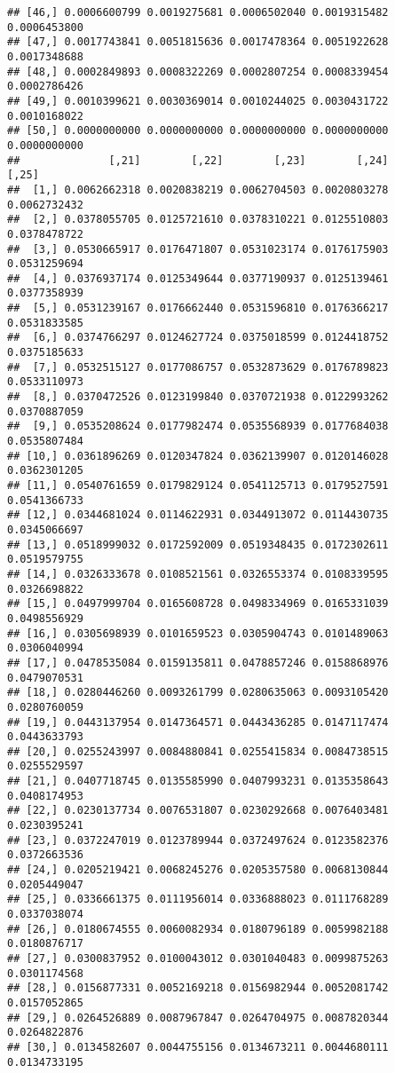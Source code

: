 \documentclass[]{article}
\begin{document}
\begin{verbatim}
## [46,] 0.0006600799 0.0019275681 0.0006502040 0.0019315482 0.0006453800
## [47,] 0.0017743841 0.0051815636 0.0017478364 0.0051922628 0.0017348688
## [48,] 0.0002849893 0.0008322269 0.0002807254 0.0008339454 0.0002786426
## [49,] 0.0010399621 0.0030369014 0.0010244025 0.0030431722 0.0010168022
## [50,] 0.0000000000 0.0000000000 0.0000000000 0.0000000000 0.0000000000
##              [,21]        [,22]        [,23]        [,24]        [,25]
##  [1,] 0.0062662318 0.0020838219 0.0062704503 0.0020803278 0.0062732432
##  [2,] 0.0378055705 0.0125721610 0.0378310221 0.0125510803 0.0378478722
##  [3,] 0.0530665917 0.0176471807 0.0531023174 0.0176175903 0.0531259694
##  [4,] 0.0376937174 0.0125349644 0.0377190937 0.0125139461 0.0377358939
##  [5,] 0.0531239167 0.0176662440 0.0531596810 0.0176366217 0.0531833585
##  [6,] 0.0374766297 0.0124627724 0.0375018599 0.0124418752 0.0375185633
##  [7,] 0.0532515127 0.0177086757 0.0532873629 0.0176789823 0.0533110973
##  [8,] 0.0370472526 0.0123199840 0.0370721938 0.0122993262 0.0370887059
##  [9,] 0.0535208624 0.0177982474 0.0535568939 0.0177684038 0.0535807484
## [10,] 0.0361896269 0.0120347824 0.0362139907 0.0120146028 0.0362301205
## [11,] 0.0540761659 0.0179829124 0.0541125713 0.0179527591 0.0541366733
## [12,] 0.0344681024 0.0114622931 0.0344913072 0.0114430735 0.0345066697
## [13,] 0.0518999032 0.0172592009 0.0519348435 0.0172302611 0.0519579755
## [14,] 0.0326333678 0.0108521561 0.0326553374 0.0108339595 0.0326698822
## [15,] 0.0497999704 0.0165608728 0.0498334969 0.0165331039 0.0498556929
## [16,] 0.0305698939 0.0101659523 0.0305904743 0.0101489063 0.0306040994
## [17,] 0.0478535084 0.0159135811 0.0478857246 0.0158868976 0.0479070531
## [18,] 0.0280446260 0.0093261799 0.0280635063 0.0093105420 0.0280760059
## [19,] 0.0443137954 0.0147364571 0.0443436285 0.0147117474 0.0443633793
## [20,] 0.0255243997 0.0084880841 0.0255415834 0.0084738515 0.0255529597
## [21,] 0.0407718745 0.0135585990 0.0407993231 0.0135358643 0.0408174953
## [22,] 0.0230137734 0.0076531807 0.0230292668 0.0076403481 0.0230395241
## [23,] 0.0372247019 0.0123789944 0.0372497624 0.0123582376 0.0372663536
## [24,] 0.0205219421 0.0068245276 0.0205357580 0.0068130844 0.0205449047
## [25,] 0.0336661375 0.0111956014 0.0336888023 0.0111768289 0.0337038074
## [26,] 0.0180674555 0.0060082934 0.0180796189 0.0059982188 0.0180876717
## [27,] 0.0300837952 0.0100043012 0.0301040483 0.0099875263 0.0301174568
## [28,] 0.0156877331 0.0052169218 0.0156982944 0.0052081742 0.0157052865
## [29,] 0.0264526889 0.0087967847 0.0264704975 0.0087820344 0.0264822876
## [30,] 0.0134582607 0.0044755156 0.0134673211 0.0044680111 0.0134733195

\end{verbatim}
\end{document}
